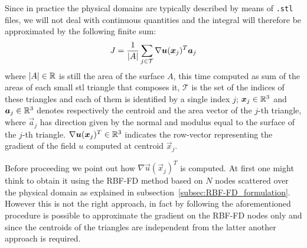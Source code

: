 Since in practice the physical domains are typically described by means of \verb*|.stl| files, we will not deal with continuous quantities and the integral will therefore be approximated by the following finite sum:
\begin{equation}
	J = \frac{1}{\lvert A\rvert} \sum_{j \in \mathcal{T}} \nabla \boldsymbol{u}(\boldsymbol{x}_j)^T \boldsymbol{a}_j
\end{equation}
where $\lvert A\rvert \in \mathbb{R}$ is still the area of the surface $A$, this time computed as sum of the areas of each small stl triangle that composes it, $\mathcal{T}$ is the set of the indices of these triangles and each of them is identified by a single index $j$; $\boldsymbol{x}_j \in \mathbb{R}^3$ and $\boldsymbol{a}_j \in \mathbb{R}^3$ denotes respectively the centroid and the area vector of the $j$-th triangle, where $\vec{a}_j$ has direction given by the normal and modulus equal to the surface of the $j$-th triangle.
$\nabla \boldsymbol{u}(\boldsymbol{x}_j)^T \in \mathbb{R}^3$ indicates the row-vector representing the gradient of the field $u$ computed at centroid $\vec{x}_j$.



\smallskip
Before proceeding we point out how $\nabla \vec{u}(\vec{x}_j)^T$ is computed. At first one might think to obtain it using the RBF-FD method based on $N$ nodes scattered over the physical domain as explained in subsection~\vref{subsec:RBF-FD_formulation}. However this is not the right approach, in fact by following the aforementioned procedure is possible to approximate the gradient on the RBF-FD nodes only and since the centroids of the triangles are independent from the latter another approach is required. 

